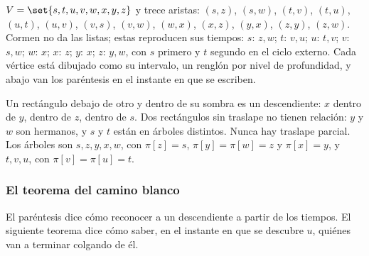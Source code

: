 \documentclass[11pt,letterpaper]{article}
\begin{document}
\begin{ejemplo}
  \label{ej:busq-fig225}
  $V = \set{s, t, u, v, w, x, y, z}$ y trece aristas: $(s,z)$,
  $(s,w)$, $(t,v)$, $(t,u)$, $(u,t)$, $(u,v)$, $(v,s)$, $(v,w)$,
  $(w,x)$, $(x,z)$, $(y,x)$, $(z,y)$, $(z,w)$. Cormen no da las
  listas; estas reproducen sus tiempos: $s$: $z, w$; $t$: $v, u$;
  $u$: $t, v$; $v$: $s, w$; $w$: $x$; $x$: $z$; $y$: $x$; $z$: $y, w$,
  con $s$ primero y $t$ segundo en el ciclo externo. Cada vértice
  está dibujado como su intervalo, un renglón por nivel de
  profundidad, y abajo van los paréntesis en el instante en que se
  escriben.
  \begin{center}
  \end{center}
  Un rectángulo debajo de otro y dentro de su sombra es un
  descendiente: $x$ dentro de $y$, dentro de $z$, dentro de $s$. Dos
  rectángulos sin traslape no tienen relación: $y$ y $w$ son hermanos,
  y $s$ y $t$ están en árboles distintos. Nunca hay traslape parcial.
  Los árboles son $s, z, y, x, w$, con $\pi[z] = s$,
  $\pi[y] = \pi[w] = z$ y $\pi[x] = y$, y $t, v, u$, con
  $\pi[v] = \pi[u] = t$.
\end{ejemplo}

\subsubsection*{El teorema del camino blanco}

El paréntesis dice cómo reconocer a un descendiente a partir de los
tiempos. El siguiente teorema dice cómo saber, en el instante en que
se descubre $u$, quiénes van a terminar colgando de él.
\end{document}
